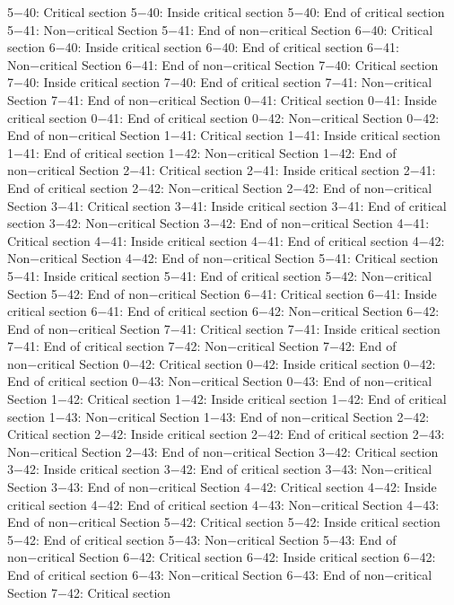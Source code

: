 5−40: Critical section
5−40: Inside critical section
5−40: End of critical section
5−41: Non−critical Section
5−41: End of non−critical Section
6−40: Critical section
6−40: Inside critical section
6−40: End of critical section
6−41: Non−critical Section
6−41: End of non−critical Section
7−40: Critical section
7−40: Inside critical section
7−40: End of critical section
7−41: Non−critical Section
7−41: End of non−critical Section
0−41: Critical section
0−41: Inside critical section
0−41: End of critical section
0−42: Non−critical Section
0−42: End of non−critical Section
1−41: Critical section
1−41: Inside critical section
1−41: End of critical section
1−42: Non−critical Section
1−42: End of non−critical Section
2−41: Critical section
2−41: Inside critical section
2−41: End of critical section
2−42: Non−critical Section
2−42: End of non−critical Section
3−41: Critical section
3−41: Inside critical section
3−41: End of critical section
3−42: Non−critical Section
3−42: End of non−critical Section
4−41: Critical section
4−41: Inside critical section
4−41: End of critical section
4−42: Non−critical Section
4−42: End of non−critical Section
5−41: Critical section
5−41: Inside critical section
5−41: End of critical section
5−42: Non−critical Section
5−42: End of non−critical Section
6−41: Critical section
6−41: Inside critical section
6−41: End of critical section
6−42: Non−critical Section
6−42: End of non−critical Section
7−41: Critical section
7−41: Inside critical section
7−41: End of critical section
7−42: Non−critical Section
7−42: End of non−critical Section
0−42: Critical section
0−42: Inside critical section
0−42: End of critical section
0−43: Non−critical Section
0−43: End of non−critical Section
1−42: Critical section
1−42: Inside critical section
1−42: End of critical section
1−43: Non−critical Section
1−43: End of non−critical Section
2−42: Critical section
2−42: Inside critical section
2−42: End of critical section
2−43: Non−critical Section
2−43: End of non−critical Section
3−42: Critical section
3−42: Inside critical section
3−42: End of critical section
3−43: Non−critical Section
3−43: End of non−critical Section
4−42: Critical section
4−42: Inside critical section
4−42: End of critical section
4−43: Non−critical Section
4−43: End of non−critical Section
5−42: Critical section
5−42: Inside critical section
5−42: End of critical section
5−43: Non−critical Section
5−43: End of non−critical Section
6−42: Critical section
6−42: Inside critical section
6−42: End of critical section
6−43: Non−critical Section
6−43: End of non−critical Section
7−42: Critical section

